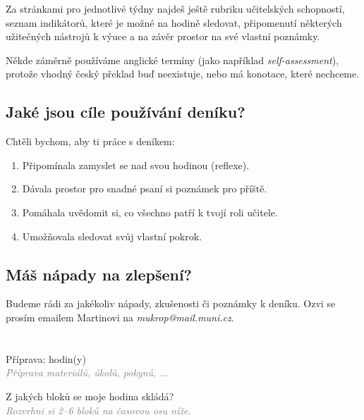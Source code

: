 \documentclass[twoside,openany]{book}
\newcommand{\note}[1]{\textcolor{gray}{\small\itshape #1}}
\newcommand{\marginsection}[3]{\marginpar{\raisebox{#2\height}{
\begin{turn}{#1}
\bfseries \color{gray} \large
#3\end{turn}}}}
\begin{document}
Za stránkami pro jednotlivé týdny najdeš ještě rubriku učitelských schopností, seznam indikátorů, které je možné na hodině sledovat, připomenutí některých užitečných nástrojů k výuce a na závěr prostor na své vlastní poznámky.

Někde záměrně používáme anglické termíny (jako například \textit{self-assessment}), protože vhodný český překlad buď neexistuje, nebo má konotace, které nechceme.

\section*{Jaké jsou cíle používání deníku?}

Chtěli bychom, aby ti práce s deníkem:
\begin{enumerate}[topsep=0pt]
\item Připomínala zamyslet se nad svou hodinou (reflexe).
\item Dávala prostor pro snadné psaní si poznámek pro příště.
\item Pomáhala uvědomit si, co všechno patří k tvojí roli učitele.
\item Umožňovala sledovat svůj vlastní pokrok.
\end{enumerate}

\section*{Máš nápady na zlepšení?}

Budeme rádi za jakékoliv nápady, zkušenosti či poznámky k deníku. Ozvi se prosím emailem Martinovi na \textit{mukrop@mail.muni.cz}.



\chapter{}
\vspace*{-2em}

\marginsection{90}{-1.3}{vyplnit před výukou}

Příprava:\hspace{1cm} hodin(y)\\
\note{Příprava materiálů, úkolů, pokynů, ...}

Z jakých bloků se moje hodina skládá?\\
\note{Rozvrhni si 2--6 bloků na časovou osu níže.}
\end{document}
